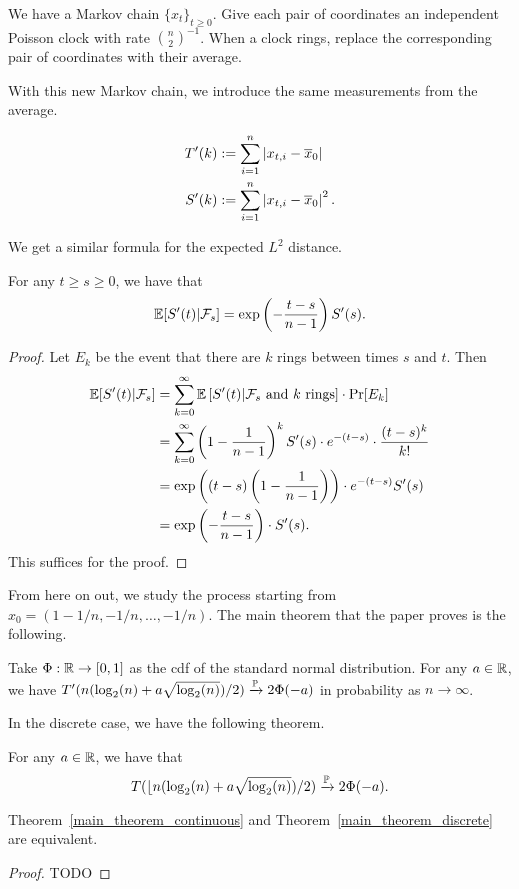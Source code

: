 \documentclass[12pt]{article}
\begin{document}
\begin{defn}
	We have a Markov chain $\{x_t\}_{t \geq 0}$. Give each pair of coordinates an independent Poisson clock with rate $\binom{n}{2}^{-1}$. When a clock rings, replace the corresponding pair of coordinates with their average. 
\end{defn}

With this new Markov chain, we introduce the same measurements from the average. 

\begin{align*}
	T'(k) & := \sum_{i = 1}^n \left | x_{t, i} - \overline{x}_0 \right | \\
	S'(k) & := \sum_{i = 1}^n \left | x_{t, i} - \overline{x}_0 \right |^2.
\end{align*}

We get a similar formula for the expected $L^2$ distance. 

\begin{prop}
	For any $t \geq s \geq 0$, we have that 
	\[
		\mathbb{E}[S'(t) | \mathcal{F}_s ] = \exp \left ( - \frac{t-s}{n-1} \right ) S'(s).	
	\]
\end{prop}
\begin{proof}
	Let $E_k$ be the event that there are $k$ rings between times $s$ and $t$. Then 
	\begin{align*}
		\mathbb{E} [ S'(t) | \mathcal{F}_s ] & = \sum_{k = 0}^\infty \mathbb{E} \left [ S'(t) | \mathcal{F}_s \text{ and $k$ rings} \right ] \cdot \Pr[E_k] \\
		& = \sum_{k = 0}^\infty \left ( 1 - \frac{1}{n-1} \right )^k S'(s) \cdot e^{-(t-s)} \cdot \frac{(t-s)^k}{k!} \\
		& = \exp \left (  (t-s) \left ( 1 - \frac{1}{n-1} \right ) \right ) \cdot e^{-(t-s)} S'(s) \\
		& = \exp \left ( - \frac{t-s}{n-1} \right ) \cdot S'(s). 
	\end{align*}
	This suffices for the proof. 
\end{proof}

From here on out, we study the process starting from $x_0 = (1 - 1/n, -1/n, \ldots, -1/n)$. The main theorem that the paper proves is the following. 

\begin{thm} \label{main_theorem_continuous}
	Take $\Phi : \mathbb{R} \to [0, 1]$ as the cdf of the standard normal distribution. For any $a \in \mathbb{R}$, we have $T'(n (\log_2(n) +a \sqrt{\log_2(n)})/2) \xrightarrow[]{\mathbb{P}} 2 \Phi(-a)$ in probability as $n \to \infty$. 
\end{thm}

In the discrete case, we have the following theorem. 

\begin{thm} \label{main_theorem_discrete}
	For any $a \in \mathbb{R}$, we have that 
	\[
		T (\lfloor{n (\log_2 (n) + a \sqrt{\log_2(n)})/2}) \xrightarrow[]{\mathbb{P}} 2 \Phi(-a).
	\]
\end{thm}

\begin{prop}
	Theorem~\ref{main_theorem_continuous} and Theorem~\ref{main_theorem_discrete} are equivalent. 
\end{prop}
\begin{proof}
	TODO
\end{proof}
\end{document}
